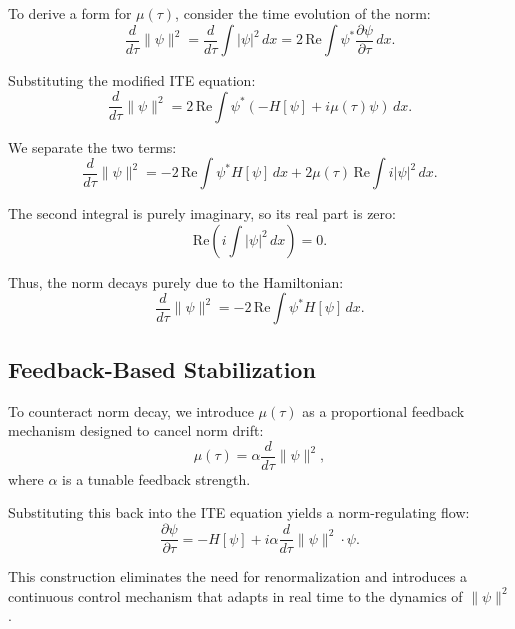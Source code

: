 \documentclass[12pt]{article}
\begin{document}
To derive a form for $\mu(\tau)$, consider the time evolution of the norm:
\begin{equation}
    \frac{d}{d\tau} \|\psi\|^2 = \frac{d}{d\tau} \int |\psi|^2 \, dx = 2 \, \mathrm{Re} \int \psi^* \frac{\partial \psi}{\partial \tau} \, dx.
\end{equation}

Substituting the modified ITE equation:
\begin{equation}
    \frac{d}{d\tau} \|\psi\|^2 = 2\, \mathrm{Re} \int \psi^* (-H[\psi] + i \mu(\tau) \psi) \, dx.
\end{equation}

We separate the two terms:
\begin{equation}
    \frac{d}{d\tau} \|\psi\|^2 = -2 \, \mathrm{Re} \int \psi^* H[\psi] \, dx + 2 \mu(\tau) \, \mathrm{Re} \int i |\psi|^2 \, dx.
\end{equation}

The second integral is purely imaginary, so its real part is zero:
\begin{equation}
    \mathrm{Re} \left( i \int |\psi|^2 \, dx \right) = 0.
\end{equation}

Thus, the norm decays purely due to the Hamiltonian:
\begin{equation}
    \frac{d}{d\tau} \|\psi\|^2 = -2 \, \mathrm{Re} \int \psi^* H[\psi] \, dx.
\end{equation}

\subsection*{Feedback-Based Stabilization}

To counteract norm decay, we introduce $\mu(\tau)$ as a proportional feedback mechanism designed to cancel norm drift:
\begin{equation}
    \mu(\tau) = \alpha \frac{d}{d\tau} \|\psi\|^2,
\end{equation}
where $\alpha$ is a tunable feedback strength.

Substituting this back into the ITE equation yields a norm-regulating flow:
\begin{equation}
    \frac{\partial \psi}{\partial \tau} = -H[\psi] + i \alpha \frac{d}{d\tau} \|\psi\|^2 \cdot \psi.
\end{equation}

This construction eliminates the need for renormalization and introduces a continuous control mechanism that adapts in real time to the dynamics of $\|\psi\|^2$.
\end{document}
